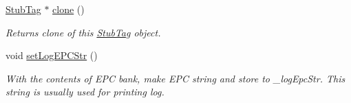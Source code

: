 \begin{DoxyCompactItemize}
\hyperlink{class_e_l_f_i_n_1_1_stub_tag}{Stub\-Tag} $\ast$ \hyperlink{class_e_l_f_i_n_1_1_stub_tag_a9e6e7741f743f5312ddc73b865eac346}{clone} ()
\begin{DoxyCompactList}\small\item\em Returns clone of this \hyperlink{class_e_l_f_i_n_1_1_stub_tag}{Stub\-Tag} object. \end{DoxyCompactList}\item 
void \hyperlink{class_e_l_f_i_n_1_1_stub_tag_a723f6fd0f93be388fc3e33e421971602}{set\-Log\-E\-P\-C\-Str} ()
\begin{DoxyCompactList}\small\item\em With the contents of E\-P\-C bank, make E\-P\-C string and store to \-\_\-log\-Epc\-Str. This string is usually used for printing log. \end{DoxyCompactList}\end{DoxyCompactItemize}
